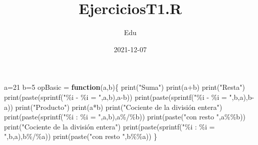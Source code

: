 \documentclass[
]{article}
\title{EjerciciosT1.R}
\author{Edu}
\date{2021-12-07}
\newenvironment{Shaded}{\begin{snugshade}}{\end{snugshade}}
\newcommand{\ControlFlowTok}[1]{\textcolor[rgb]{0.13,0.29,0.53}{\textbf{#1}}}
\newcommand{\DecValTok}[1]{\textcolor[rgb]{0.00,0.00,0.81}{#1}}
\newcommand{\FunctionTok}[1]{\textcolor[rgb]{0.00,0.00,0.00}{#1}}
\newcommand{\NormalTok}[1]{#1}
\newcommand{\OtherTok}[1]{\textcolor[rgb]{0.56,0.35,0.01}{#1}}
\newcommand{\SpecialCharTok}[1]{\textcolor[rgb]{0.00,0.00,0.00}{#1}}
\newcommand{\StringTok}[1]{\textcolor[rgb]{0.31,0.60,0.02}{#1}}
\begin{document}
\maketitle

\begin{Shaded}
\begin{Highlighting}[]
\NormalTok{a}\OtherTok{=}\DecValTok{21}
\NormalTok{b}\OtherTok{=}\DecValTok{5}
\NormalTok{opBasic }\OtherTok{=} \ControlFlowTok{function}\NormalTok{(a,b)\{}
  \FunctionTok{print}\NormalTok{(}\StringTok{"Suma"}\NormalTok{)}
  \FunctionTok{print}\NormalTok{(a}\SpecialCharTok{+}\NormalTok{b)}
  \FunctionTok{print}\NormalTok{(}\StringTok{"Resta"}\NormalTok{)}
  \FunctionTok{print}\NormalTok{(}\FunctionTok{paste}\NormalTok{(}\FunctionTok{sprintf}\NormalTok{(}\StringTok{"\%i {-} \%i = "}\NormalTok{,a,b),a}\SpecialCharTok{{-}}\NormalTok{b))}
  \FunctionTok{print}\NormalTok{(}\FunctionTok{paste}\NormalTok{(}\FunctionTok{sprintf}\NormalTok{(}\StringTok{"\%i {-} \%i = "}\NormalTok{,b,a),b}\SpecialCharTok{{-}}\NormalTok{a))}
  \FunctionTok{print}\NormalTok{(}\StringTok{"Producto"}\NormalTok{)}
  \FunctionTok{print}\NormalTok{(a}\SpecialCharTok{*}\NormalTok{b)}
  \FunctionTok{print}\NormalTok{(}\StringTok{"Cociente de la división entera"}\NormalTok{)}
  \FunctionTok{print}\NormalTok{(}\FunctionTok{paste}\NormalTok{(}\FunctionTok{sprintf}\NormalTok{(}\StringTok{"\%i : \%i = "}\NormalTok{,a,b),a}\SpecialCharTok{\%/\%}\NormalTok{b))}
  \FunctionTok{print}\NormalTok{(}\FunctionTok{paste}\NormalTok{(}\StringTok{"con resto "}\NormalTok{,a}\SpecialCharTok{\%\%}\NormalTok{b))}
  \FunctionTok{print}\NormalTok{(}\StringTok{"Cociente de la división entera"}\NormalTok{)}
  \FunctionTok{print}\NormalTok{(}\FunctionTok{paste}\NormalTok{(}\FunctionTok{sprintf}\NormalTok{(}\StringTok{"\%i : \%i = "}\NormalTok{,b,a),b}\SpecialCharTok{\%/\%}\NormalTok{a))}
  \FunctionTok{print}\NormalTok{(}\FunctionTok{paste}\NormalTok{(}\StringTok{"con resto "}\NormalTok{,b}\SpecialCharTok{\%\%}\NormalTok{a))}
\NormalTok{\}}
\end{Highlighting}
\end{Shaded}
\end{document}
